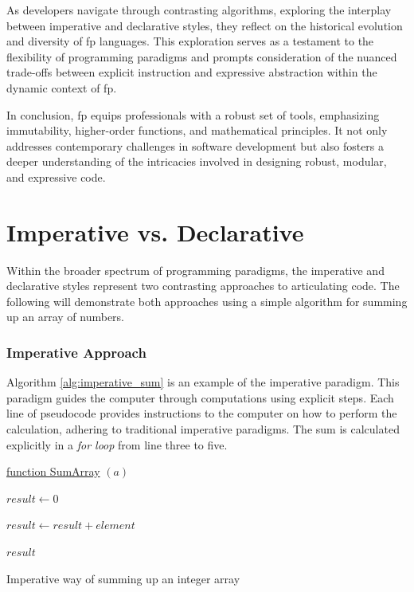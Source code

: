     As developers navigate through contrasting algorithms, exploring the interplay between imperative and declarative styles, they reflect on the historical evolution and diversity of \ac{fp} languages. This exploration serves as a testament to the flexibility of programming paradigms and prompts consideration of the nuanced trade-offs between explicit instruction and expressive abstraction within the dynamic context of \ac{fp}.
    
    In conclusion, \ac{fp} equips professionals with a robust set of tools, emphasizing immutability, higher-order functions, and mathematical principles. It not only addresses contemporary challenges in software development but also fosters a deeper understanding of the intricacies involved in designing robust, modular, and expressive code.
    

\section*{Imperative vs. Declarative}

Within the broader spectrum of programming paradigms, the imperative and declarative styles represent two contrasting approaches to articulating code. The following will demonstrate both approaches using a simple algorithm for summing up an array of numbers.

\subsubsection{Imperative Approach}

Algorithm \ref{alg:imperative_sum} is an example of the imperative paradigm. This paradigm guides the computer through computations using explicit steps. Each line of pseudocode provides instructions to the computer on how to perform the calculation, adhering to traditional imperative paradigms. The sum is calculated explicitly in a \textit{for loop} from line three to five.

\begin{algorithm}

    \underline{function SumArray} $(a)$\;
    
    \BlankLine
    $result \leftarrow 0$
    
    {
        $result \leftarrow result + element$
    }
    
    \Return $result$
    
    \caption{Imperative way of summing up an integer array}
    \label{alg:imperative_sum}
\end{algorithm}

